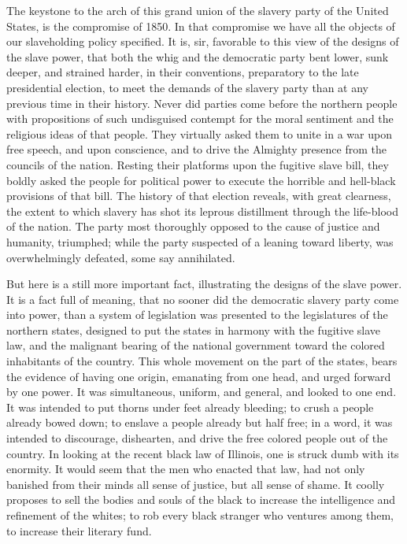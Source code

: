 The keystone to the arch of this grand union of the slavery party of the
United States, is the compromise of 1850. In that compromise we have all
the objects of our slaveholding policy specified. It is, sir, favorable
to this view of the designs of the slave power, that both the whig and
the democratic party bent lower, sunk deeper, and strained harder, in
their conventions, preparatory to the late presidential election, to
meet the demands of the slavery party than at any previous time in their
history. Never did parties come before the northern people with
propositions of such {\protect\hypertarget{453}{}{}}undisguised contempt
for the moral sentiment and the religious ideas of that people. They
virtually asked them to unite in a war upon free speech, and upon
conscience, and to drive the Almighty presence from the councils of the
nation. Resting their platforms upon the fugitive slave bill, they
boldly asked the people for political power to execute the horrible and
hell-black provisions of that bill. The history of that election
reveals, with great clearness, the extent to which slavery has shot its
leprous distillment through the life-blood of the nation. The party most
thoroughly opposed to the cause of justice and humanity, triumphed;
while the party suspected of a leaning toward liberty, was
overwhelmingly defeated, some say annihilated.

But here is a still more important fact, illustrating the designs of the
slave power. It is a fact full of meaning, that no sooner did the
democratic slavery party come into power, than a system of legislation
was presented to the legislatures of the northern states, designed to
put the states in harmony with the fugitive slave law, and the malignant
bearing of the national government toward the colored inhabitants of the
country. This whole movement on the part of the states, bears the
evidence of having one origin, emanating from one head, and urged
forward by one power. It was simultaneous, uniform, and general, and
looked to one end. It was intended to put thorns under feet already
bleeding; to crush a people already bowed down; to enslave a people
already but half free; in a word, it was intended to discourage,
dishearten, and drive the free colored people out of the country. In
looking at the recent black law of Illinois, one is struck dumb with its
enormity. It would seem that the men who enacted that law, had not only
banished from their minds all sense of justice, but all sense of shame.
It coolly proposes to sell the bodies and souls of the black to increase
the intelligence and refinement of the whites; to rob every black
stranger who ventures among them, to increase their literary fund.

